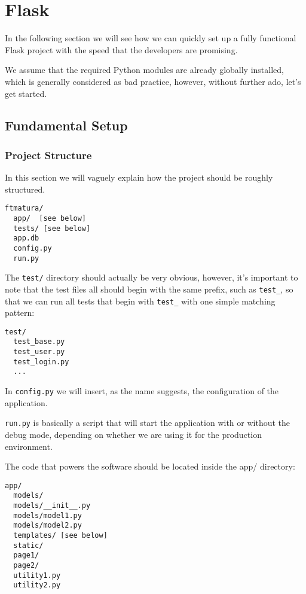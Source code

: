 \documentclass[../main/main.tex]{subfiles}
\begin{document}
\section{Flask}  

In the following section we will see how we can quickly set up a fully
functional Flask project with the speed that the developers are
promising.

We assume that the required Python modules are already globally
installed, which is generally considered as bad practice, however,
without further ado, let's get started.

\subsection{Fundamental Setup}

\subsubsection{Project Structure}

In this section we will vaguely explain how the project should be
roughly structured.

\begin{lstlisting}
ftmatura/
  app/  [see below]
  tests/ [see below]
  app.db
  config.py
  run.py
\end{lstlisting}

The \lstinline|test/| directory should actually be very obvious,
however, it's important to note that the test files all should begin
with the same prefix, such as \lstinline|test_|, so that we can run
all tests that begin with \lstinline|test_| with one simple matching
pattern:

\begin{lstlisting}
test/
  test_base.py
  test_user.py
  test_login.py
  ...
\end{lstlisting}

In \lstinline|config.py| we will insert, as the name suggests, the
configuration of the application. 

\lstinline|run.py| is basically a script that will start the
application with or without the debug mode, depending on whether we
are using it for the production environment. 

The code that powers the software should be located inside the app/
directory:

\begin{lstlisting}
app/
  models/
  models/__init__.py
  models/model1.py
  models/model2.py
  templates/ [see below]
  static/ 
  page1/
  page2/ 
  utility1.py
  utility2.py
\end{lstlisting}
\end{document}
